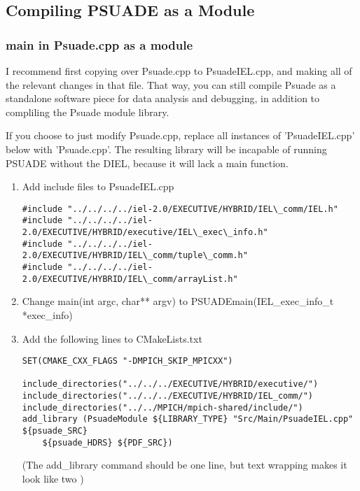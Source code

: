\subsection{Compiling PSUADE as a Module}
\subsubsection{main in Psuade.cpp as a module}


I recommend first copying over Psuade.cpp to PsuadeIEL.cpp, and making all of the relevant changes in that file. That way, you can still compile Psuade as a standalone software piece for data analysis and debugging, in addition to compliling the Psuade module library.

If you choose to just modify Psuade.cpp, replace all instances of 'PsuadeIEL.cpp' below with 'Psuade.cpp'. The resulting library will be incapable of running PSUADE without the DIEL, because it will lack a main function.

\begin{enumerate}

	\item Add include files to PsuadeIEL.cpp

\begin{verbatim}
#include "../../../../iel-2.0/EXECUTIVE/HYBRID/IEL\_comm/IEL.h"
#include "../../../../iel-2.0/EXECUTIVE/HYBRID/executive/IEL\_exec\_info.h"
#include "../../../../iel-2.0/EXECUTIVE/HYBRID/IEL\_comm/tuple\_comm.h"
#include "../../../../iel-2.0/EXECUTIVE/HYBRID/IEL\_comm/arrayList.h"
\end{verbatim}


	\item Change main(int argc, char** argv)  to PSUADEmain(IEL\_exec\_info\_t *exec\_info)


	\item Add the following lines to CMakeLists.txt
\begin{verbatim}
SET(CMAKE_CXX_FLAGS "-DMPICH_SKIP_MPICXX")

include_directories("../../../EXECUTIVE/HYBRID/executive/")
include_directories("../../../EXECUTIVE/HYBRID/IEL_comm/")
include_directories("../../MPICH/mpich-shared/include/")
add_library (PsuadeModule ${LIBRARY_TYPE} "Src/Main/PsuadeIEL.cpp" ${psuade_SRC}
    ${psuade_HDRS} ${PDF_SRC})
\end{verbatim}

(The add\_library command should be one line, but text wrapping makes it look like two   )

\end{enumerate}

